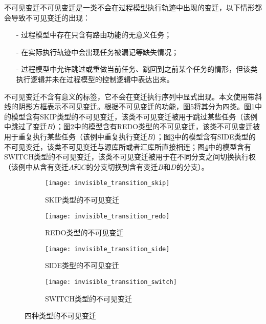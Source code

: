 {\heiti 不可见变迁\qquad}不可见变迁是一类不会在过程模型执行轨迹中出现的变迁，以下情形都会导致不可见变迁的出现：
\begin{itemize}
  \item[-] 过程模型中存在只含有路由功能的无意义任务；
  \item[-] 在实际执行轨迹中会出现任务被漏记等缺失情况；
  \item[-] 过程模型中允许跳过或重做当前任务、跳回到之前某个任务的情形，但该类执行逻辑并未在过程模型的控制逻辑中表达出来。
\end{itemize}
不可见变迁不含有意义的标签，它不会在变迁执行序列中显式出现。本文使用带斜线的阴影方框表示不可见变迁。根据不可见变迁的功能，图\ref{fig:invisible_transition_types}将其分为四类。图\ref{fig:invisible_transition_skip}中的模型含有SKIP类型的不可见变迁，该类不可见变迁被用于跳过某些任务（该例中跳过了变迁$B$）；图\ref{fig:invisible_transition_redo}中的模型含有REDO类型的不可见变迁，该类不可见变迁被用于重复执行某些任务（该例中重复执行变迁$B$）；图\ref{fig:invisible_transition_side}中的模型含有SIDE类型的不可见变迁，该类不可见变迁与源库所或者汇库所直接相连；图\ref{fig:invisible_transition_switch}中的模型含有SWITCH类型的不可见变迁，该类不可见变迁被用于在不同分支之间切换执行权（该例中从含有变迁$A$和$C$的分支切换到含有变迁$B$和$D$的分支）。

\begin{figure}[htbp]
  \centering
  \begin{subfigure}[b]{0.48\textwidth}
    \centering
    \texttt{[image: invisible\_transition\_skip]}
    \caption{SKIP类型的不可见变迁}
    \label{fig:invisible_transition_skip}
  \end{subfigure}
  \begin{subfigure}[b]{0.48\textwidth}
    \centering
    \texttt{[image: invisible\_transition\_redo]}
    \caption{REDO类型的不可见变迁}
    \label{fig:invisible_transition_redo}
  \end{subfigure}
  \begin{subfigure}[b]{0.48\textwidth}
    \vspace{1em}
    \centering
    \texttt{[image: invisible\_transition\_side]}
    \caption{SIDE类型的不可见变迁}
    \label{fig:invisible_transition_side}
  \end{subfigure}
  \begin{subfigure}[b]{0.48\textwidth}
    \vspace{1em}
    \centering
    \texttt{[image: invisible\_transition\_switch]}
    \caption{SWITCH类型的不可见变迁}
    \label{fig:invisible_transition_switch}
  \end{subfigure}
  \vspace{6pt}
  \caption{四种类型的不可见变迁}
  \label{fig:invisible_transition_types}
\end{figure}

